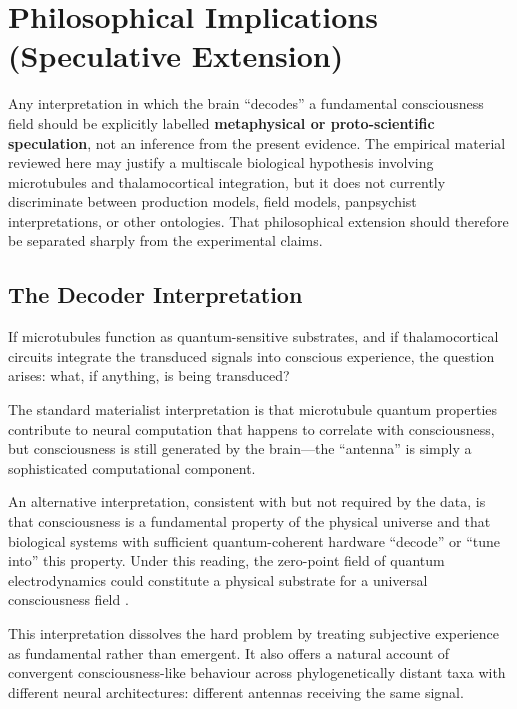 \documentclass[10pt, a4paper, twocolumn]{article}
\begin{document}
\section{Philosophical Implications (Speculative Extension)}

Any interpretation in which the brain ``decodes'' a fundamental
consciousness field should be explicitly labelled \textbf{metaphysical
or proto-scientific speculation}, not an inference from the present
evidence. The empirical material reviewed here may justify a multiscale
biological hypothesis involving microtubules and thalamocortical
integration, but it does not currently discriminate between production
models, field models, panpsychist interpretations, or other ontologies.
That philosophical extension should therefore be separated sharply from
the experimental claims.

\subsection{The Decoder Interpretation}

If microtubules function as quantum-sensitive substrates, and if
thalamocortical circuits integrate the transduced signals into conscious
experience, the question arises: what, if anything, is being transduced?

The standard materialist interpretation is that microtubule quantum
properties contribute to neural computation that happens to correlate
with consciousness, but consciousness is still generated by the
brain---the ``antenna'' is simply a sophisticated computational
component.

An alternative interpretation, consistent with but not required by the
data, is that consciousness is a fundamental property of the physical
universe and that biological systems with sufficient quantum-coherent
hardware ``decode'' or ``tune into'' this property. Under this reading,
the zero-point field of quantum electrodynamics could constitute a
physical substrate for a universal consciousness field
\cite{keppler2021}.

This interpretation dissolves the hard problem by treating subjective
experience as fundamental rather than emergent. It also offers a natural
account of convergent consciousness-like behaviour across phylogenetically
distant taxa with different neural architectures: different antennas
receiving the same signal.
\end{document}

